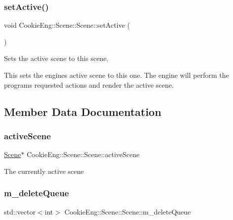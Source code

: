 \subsubsection{\texorpdfstring{set\+Active()}{setActive()}}
{\footnotesize\ttfamily void Cookie\+Eng\+::\+Scene\+::\+Scene\+::set\+Active (\begin{DoxyParamCaption}{ }\end{DoxyParamCaption})\hspace{0.3cm}{\ttfamily [inline]}}



Sets the active scene to this scene. 

This sets the engine\textquotesingle{}s active scene to this one. The engine will perform the programs requested actions and render the active scene. 

\subsection{Member Data Documentation}
\mbox{\label{class_cookie_eng_1_1_scene_1_1_scene_a367277df49168535200a279da96d11c2}} 
\subsubsection{\texorpdfstring{active\+Scene}{activeScene}}
{\footnotesize\ttfamily \hyperlink{class_cookie_eng_1_1_scene_1_1_scene}{Scene}$\ast$ Cookie\+Eng\+::\+Scene\+::\+Scene\+::active\+Scene\hspace{0.3cm}{\ttfamily [static]}}

The currently active scene \mbox{\label{class_cookie_eng_1_1_scene_1_1_scene_a57af2369c4079df376fa6137b6249eaf}} 
\subsubsection{\texorpdfstring{m\+\_\+delete\+Queue}{m\_deleteQueue}}
{\footnotesize\ttfamily std\+::vector$<$int$>$ Cookie\+Eng\+::\+Scene\+::\+Scene\+::m\+\_\+delete\+Queue\hspace{0.3cm}{\ttfamily [protected]}}

